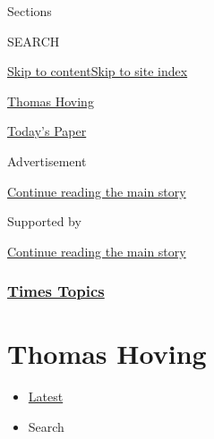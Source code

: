 Sections

SEARCH

\protect\hyperlink{site-content}{Skip to
content}\protect\hyperlink{site-index}{Skip to site index}

\href{https://www.nytimes3xbfgragh.onion/topic/person/thomas-hoving}{Thomas
Hoving}

\href{https://myaccount.nytimes3xbfgragh.onion/auth/login?response_type=cookie\&client_id=vi}{}

\href{https://www.nytimes3xbfgragh.onion/section/todayspaper}{Today's
Paper}

Advertisement

\protect\hyperlink{after-top}{Continue reading the main story}

Supported by

\protect\hyperlink{after-sponsor}{Continue reading the main story}

\hypertarget{times-topics}{%
\subsubsection{\texorpdfstring{\href{/index.html}{Times
Topics}}{Times Topics}}\label{times-topics}}

\hypertarget{thomas-hoving}{%
\section{Thomas Hoving}\label{thomas-hoving}}

\begin{itemize}
\tightlist
\item
  \protect\hyperlink{stream-panel}{Latest}
\item
  Search
\end{itemize}

